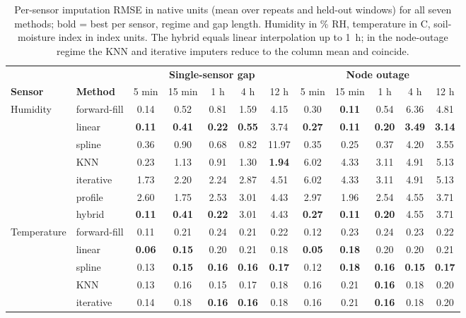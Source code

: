 \begin{table}[!ht]
\centering
\footnotesize
\caption{Per-sensor imputation RMSE in native units (mean over repeats and held-out windows) for all seven methods; bold = best per sensor, regime and gap length. Humidity in \% RH, temperature in \textdegree C, soil-moisture index in index units. The hybrid equals linear interpolation up to 1~h; in the node-outage regime the KNN and iterative imputers reduce to the column mean and coincide.}
\label{tab:imputation-sensor}
\setlength{\tabcolsep}{3.5pt}
\begin{tabular}{llccccc|ccccc}
\toprule
 & & \multicolumn{5}{c|}{\textbf{Single-sensor gap}} & \multicolumn{5}{c}{\textbf{Node outage}} \\
\textbf{Sensor} & \textbf{Method} & 5 min & 15 min & 1 h & 4 h & 12 h & 5 min & 15 min & 1 h & 4 h & 12 h \\
\midrule
Humidity & forward-fill & 0.14 & 0.52 & 0.81 & 1.59 & 4.15 & 0.30 & \textbf{0.11} & 0.54 & 6.36 & 4.81 \\
 & linear & \textbf{0.11} & \textbf{0.41} & \textbf{0.22} & \textbf{0.55} & 3.74 & \textbf{0.27} & \textbf{0.11} & \textbf{0.20} & \textbf{3.49} & \textbf{3.14} \\
 & spline & 0.36 & 0.90 & 0.68 & 0.82 & 11.97 & 0.35 & 0.25 & 0.37 & 4.20 & 3.55 \\
 & KNN & 0.23 & 1.13 & 0.91 & 1.30 & \textbf{1.94} & 6.02 & 4.33 & 3.11 & 4.91 & 5.13 \\
 & iterative & 1.73 & 2.20 & 2.24 & 2.87 & 4.51 & 6.02 & 4.33 & 3.11 & 4.91 & 5.13 \\
 & profile & 2.60 & 1.75 & 2.53 & 3.01 & 4.43 & 2.97 & 1.96 & 2.54 & 4.55 & 3.71 \\
 & hybrid & \textbf{0.11} & \textbf{0.41} & \textbf{0.22} & 3.01 & 4.43 & \textbf{0.27} & \textbf{0.11} & \textbf{0.20} & 4.55 & 3.71 \\
\midrule
Temperature & forward-fill & 0.11 & 0.21 & 0.24 & 0.21 & 0.22 & 0.12 & 0.23 & 0.24 & 0.23 & 0.22 \\
 & linear & \textbf{0.06} & \textbf{0.15} & 0.20 & 0.21 & 0.18 & \textbf{0.05} & \textbf{0.18} & 0.20 & 0.20 & 0.21 \\
 & spline & 0.13 & \textbf{0.15} & \textbf{0.16} & \textbf{0.16} & \textbf{0.17} & 0.12 & \textbf{0.18} & \textbf{0.16} & \textbf{0.15} & \textbf{0.17} \\
 & KNN & 0.13 & 0.16 & 0.15 & 0.17 & 0.18 & 0.16 & 0.21 & \textbf{0.16} & 0.18 & 0.20 \\
 & iterative & 0.14 & 0.18 & \textbf{0.16} & \textbf{0.16} & 0.18 & 0.16 & 0.21 & \textbf{0.16} & 0.18 & 0.20 \\

\end{tabular}
\end{table}
